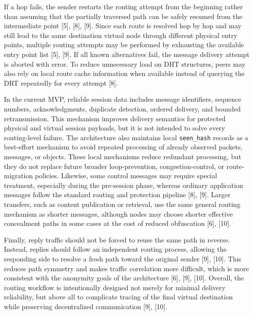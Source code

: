 \documentclass[12pt,a4paper]{article}
\begin{document}
If a hop fails, the sender restarts the routing attempt from the beginning rather than assuming that the partially traversed path can be safely resumed from the intermediate point [5], [8], [9]. Since each route is resolved hop by hop and may still lead to the same destination virtual node through different physical entry points, multiple routing attempts may be performed by exhausting the available entry point list [5], [9]. If all known alternatives fail, the message delivery attempt is aborted with error. To reduce unnecessary load on DHT structures, peers may also rely on local route cache information when available instead of querying the DRT repeatedly for every attempt [8].

In the current MVP, reliable session data includes message identifiers, sequence numbers, acknowledgments, duplicate detection, ordered delivery, and bounded retransmission. This mechanism improves delivery semantics for protected physical and virtual session payloads, but it is not intended to solve every routing-level failure. The architecture also maintains local \texttt{seen\_hash} records as a best-effort mechanism to avoid repeated processing of already observed packets, messages, or objects. These local mechanisms reduce redundant processing, but they do not replace future broader loop-prevention, congestion-control, or route-migration policies. Likewise, some control messages may require special treatment, especially during the pre-session phase, whereas ordinary application messages follow the standard routing and protection pipeline [8], [9]. Larger transfers, such as content publication or retrieval, use the same general routing mechanism as shorter messages, although nodes may choose shorter effective concealment paths in some cases at the cost of reduced obfuscation [6], [10].

Finally, reply traffic should not be forced to reuse the same path in reverse. Instead, replies should follow an independent routing process, allowing the responding side to resolve a fresh path toward the original sender [9], [10]. This reduces path symmetry and makes traffic correlation more difficult, which is more consistent with the anonymity goals of the architecture [6], [9], [10]. Overall, the routing workflow is intentionally designed not merely for minimal delivery reliability, but above all to complicate tracing of the final virtual destination while preserving decentralized communication [9], [10].
\end{document}
